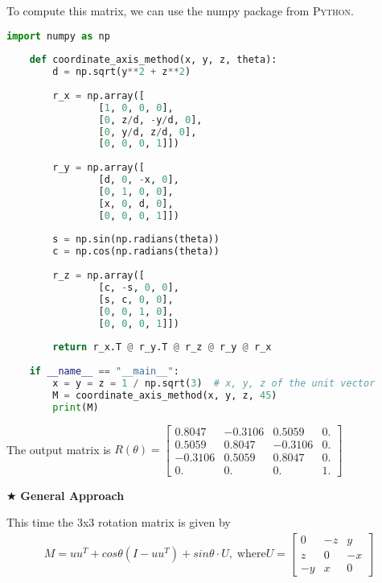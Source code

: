 \documentclass[11pt]{article}  %
\begin{document}
    To compute this matrix, we can use the numpy package from \textsc{Python}.\\
    \begin{lstlisting}[language=python,numbers=none]
    import numpy as np
    
    def coordinate_axis_method(x, y, z, theta):
        d = np.sqrt(y**2 + z**2)
    
        r_x = np.array([
                [1, 0, 0, 0],
                [0, z/d, -y/d, 0],
                [0, y/d, z/d, 0],
                [0, 0, 0, 1]])
    
        r_y = np.array([
                [d, 0, -x, 0],
                [0, 1, 0, 0],
                [x, 0, d, 0],
                [0, 0, 0, 1]])
    
        s = np.sin(np.radians(theta))
        c = np.cos(np.radians(theta))
    
        r_z = np.array([
                [c, -s, 0, 0],
                [s, c, 0, 0],
                [0, 0, 1, 0],
                [0, 0, 0, 1]])
    
        return r_x.T @ r_y.T @ r_z @ r_y @ r_x
    
    if __name__ == "__main__":
        x = y = z = 1 / np.sqrt(3)  # x, y, z of the unit vector
        M = coordinate_axis_method(x, y, z, 45)
        print(M)
    \end{lstlisting}
    
    The output matrix is
    $R(\theta) = \begin{bmatrix}
    0.8047  & -0.3106 &  0.5059 &  0.\\
    0.5059  &  0.8047 & -0.3106 &  0.\\
    -0.3106 &  0.5059 &  0.8047 &  0.\\
    0.      &  0.     &  0.     &  1.
    \end{bmatrix}$\\

    \newpage
    
    \noindent $\bigstar$ \textbf{ General Approach}\vspace{2mm}
    
    This time the 3x3 rotation matrix is given by
    \begin{align*}
        M=uu^T+cos\theta (I-uu^T)+sin\theta \cdot U,\; \text{where} U=
        \begin{bmatrix}
            0 & -z & y\\
            z & 0 & -x\\
            -y & x & 0
        \end{bmatrix}
    \end{align*}
    
\end{document}
